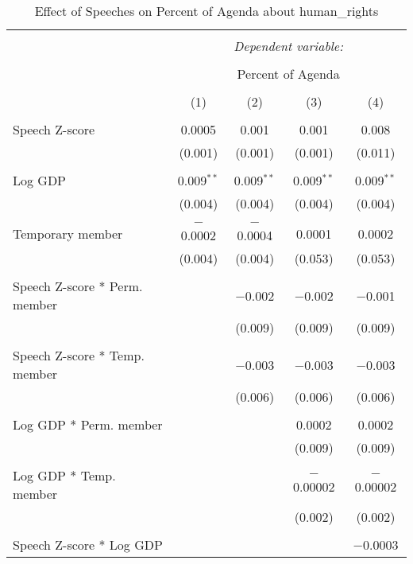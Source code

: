 
\begin{table}[!htbp] \centering 
  \caption{Effect of Speeches on Percent of Agenda about human_rights} 
  \label{} 
\begin{tabular}{@{\extracolsep{5pt}}lcccc} 
\\[-1.8ex]\hline 
\hline \\[-1.8ex] 
 & \multicolumn{4}{c}{\textit{Dependent variable:}} \\ 
\cline{2-5} 
\\[-1.8ex] & \multicolumn{4}{c}{Percent of Agenda} \\ 
\\[-1.8ex] & (1) & (2) & (3) & (4)\\ 
\hline \\[-1.8ex] 
 Speech Z-score & 0.0005 & 0.001 & 0.001 & 0.008 \\ 
  & (0.001) & (0.001) & (0.001) & (0.011) \\ 
  & & & & \\ 
 Log GDP & 0.009$^{**}$ & 0.009$^{**}$ & 0.009$^{**}$ & 0.009$^{**}$ \\ 
  & (0.004) & (0.004) & (0.004) & (0.004) \\ 
  & & & & \\ 
 Temporary member & $-$0.0002 & $-$0.0004 & 0.0001 & 0.0002 \\ 
  & (0.004) & (0.004) & (0.053) & (0.053) \\ 
  & & & & \\ 
 Speech Z-score * Perm. member &  & $-$0.002 & $-$0.002 & $-$0.001 \\ 
  &  & (0.009) & (0.009) & (0.009) \\ 
  & & & & \\ 
 Speech Z-score * Temp. member &  & $-$0.003 & $-$0.003 & $-$0.003 \\ 
  &  & (0.006) & (0.006) & (0.006) \\ 
  & & & & \\ 
 Log GDP * Perm. member &  &  & 0.0002 & 0.0002 \\ 
  &  &  & (0.009) & (0.009) \\ 
  & & & & \\ 
 Log GDP * Temp. member &  &  & $-$0.00002 & $-$0.00002 \\ 
  &  &  & (0.002) & (0.002) \\ 
  & & & & \\ 
 Speech Z-score * Log GDP &  &  &  & $-$0.0003 \\ 

\end{tabular}
\end{table}
